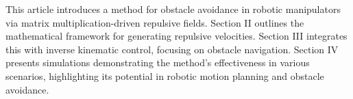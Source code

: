 \documentclass[letterpaper, 10 pt, conference]{ieeeconf}  %
\begin{document}
This article introduces a method for obstacle avoidance in robotic manipulators via matrix multiplication-driven repulsive fields. Section II outlines the mathematical framework for generating repulsive velocities. Section III integrates this with inverse kinematic control, focusing on obstacle navigation. Section IV presents simulations demonstrating the method's effectiveness in various scenarios, highlighting its potential in robotic motion planning and obstacle avoidance.

%
%
%
%
\end{document}

